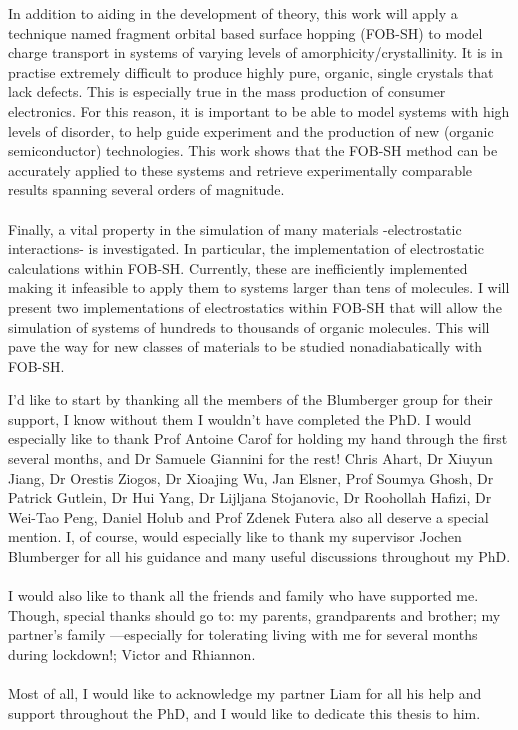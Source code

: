 In addition to aiding in the development of theory, this work will apply a technique named fragment orbital based surface hopping (FOB-SH) to model charge transport in systems of varying levels of amorphicity/crystallinity. It is in practise extremely difficult to produce highly pure, organic, single crystals that lack defects. This is especially true in the mass production of consumer electronics. For this reason, it is important to be able to model systems with high levels of disorder, to help guide experiment and the production of new (organic semiconductor) technologies. This work shows that the FOB-SH method can be accurately applied to these systems and retrieve experimentally comparable results spanning several orders of magnitude.
\\\\
Finally, a vital property in the simulation of many materials -electrostatic interactions- is investigated. In particular, the implementation of electrostatic calculations within FOB-SH. Currently, these are inefficiently implemented making it infeasible to apply them to systems larger than tens of molecules. I will present two implementations of electrostatics within FOB-SH that will allow the simulation of systems of hundreds to thousands of organic molecules.  This will pave the way for new classes of materials to be studied nonadiabatically with FOB-SH.


\begin{acknowledgements}
I'd like to start by thanking all the members of the Blumberger group for their support, I know without them I wouldn't have completed the PhD. I would especially like to thank Prof Antoine Carof for holding my hand through the first several months, and Dr Samuele Giannini for the rest! Chris Ahart, Dr Xiuyun Jiang, Dr Orestis Ziogos, Dr Xioajing Wu, Jan Elsner, Prof Soumya Ghosh, Dr Patrick Gutlein, Dr Hui Yang, Dr Lijljana Stojanovic, Dr Roohollah Hafizi, Dr Wei-Tao Peng, Daniel Holub and Prof Zdenek Futera also all deserve a special mention. I, of course, would especially like to thank my supervisor Jochen Blumberger for all his guidance and many useful discussions throughout my PhD.
\\\\
I would also like to thank all the friends and family who have supported me. Though, special thanks should go to: my parents, grandparents and brother; my partner's family ---especially for tolerating  living with me for several months during lockdown!; Victor and Rhiannon.
\\\\
Most of all, I would like to acknowledge my partner Liam for all his help and support throughout the PhD, and I would like to dedicate this thesis to him.
\end{acknowledgements}

\setcounter{tocdepth}{2} 

\tableofcontents
\listoffigures
\listoftables

